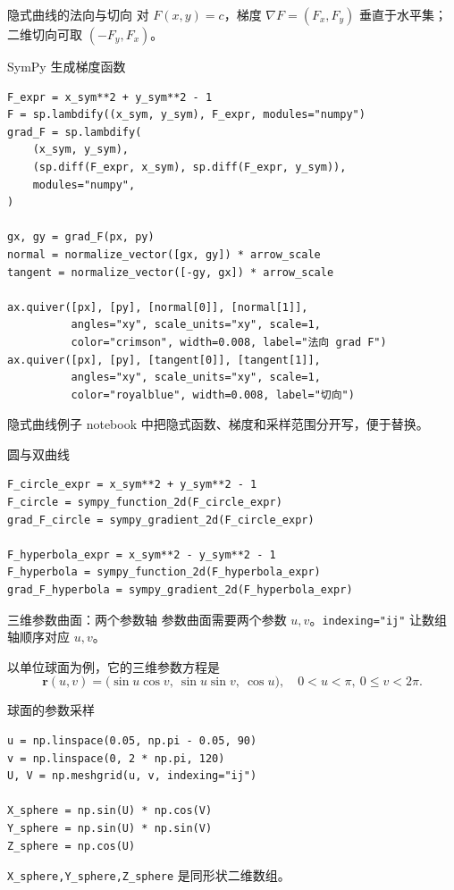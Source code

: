\documentclass[aspectratio=169,11pt]{ctexbeamer}
\begin{document}
\begin{frame}[fragile]{隐式曲线的法向与切向}
  对 \(F(x,y)=c\)，梯度 \(\nabla F=(F_x,F_y)\) 垂直于水平集；二维切向可取 \((-F_y,F_x)\)。

  \begin{block}{SymPy 生成梯度函数}
\begin{Verbatim}[fontsize=\tiny]
F_expr = x_sym**2 + y_sym**2 - 1
F = sp.lambdify((x_sym, y_sym), F_expr, modules="numpy")
grad_F = sp.lambdify(
    (x_sym, y_sym),
    (sp.diff(F_expr, x_sym), sp.diff(F_expr, y_sym)),
    modules="numpy",
)

gx, gy = grad_F(px, py)
normal = normalize_vector([gx, gy]) * arrow_scale
tangent = normalize_vector([-gy, gx]) * arrow_scale

ax.quiver([px], [py], [normal[0]], [normal[1]],
          angles="xy", scale_units="xy", scale=1,
          color="crimson", width=0.008, label="法向 grad F")
ax.quiver([px], [py], [tangent[0]], [tangent[1]],
          angles="xy", scale_units="xy", scale=1,
          color="royalblue", width=0.008, label="切向")
\end{Verbatim}
  \end{block}
\end{frame}

\begin{frame}[fragile]{隐式曲线例子}
  notebook 中把隐式函数、梯度和采样范围分开写，便于替换。

  \begin{block}{圆与双曲线}
\begin{Verbatim}[fontsize=\tiny]
F_circle_expr = x_sym**2 + y_sym**2 - 1
F_circle = sympy_function_2d(F_circle_expr)
grad_F_circle = sympy_gradient_2d(F_circle_expr)

F_hyperbola_expr = x_sym**2 - y_sym**2 - 1
F_hyperbola = sympy_function_2d(F_hyperbola_expr)
grad_F_hyperbola = sympy_gradient_2d(F_hyperbola_expr)
\end{Verbatim}
  \end{block}
\end{frame}

\begin{frame}[fragile]{三维参数曲面：两个参数轴}
  参数曲面需要两个参数 \(u,v\)。\texttt{indexing="ij"} 让数组轴顺序对应 \(u,v\)。

  以单位球面为例，它的三维参数方程是
  \[
    \mathbf r(u,v)=
    \bigl(\sin u\cos v,\ \sin u\sin v,\ \cos u\bigr),
    \quad 0<u<\pi,\ 0\le v<2\pi .
  \]

  \begin{block}{球面的参数采样}
\begin{Verbatim}[fontsize=\tiny]
u = np.linspace(0.05, np.pi - 0.05, 90)
v = np.linspace(0, 2 * np.pi, 120)
U, V = np.meshgrid(u, v, indexing="ij")

X_sphere = np.sin(U) * np.cos(V)
Y_sphere = np.sin(U) * np.sin(V)
Z_sphere = np.cos(U)
\end{Verbatim}
  \end{block}

  \texttt{X\_sphere,Y\_sphere,Z\_sphere} 是同形状二维数组。
\end{frame}
\end{document}
